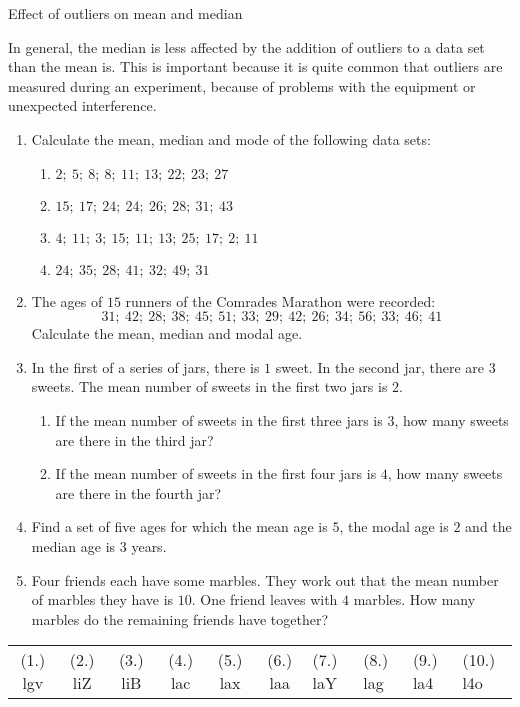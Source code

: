 \begin{wex}{Effect of outliers on mean and median}
{  In general, the median is less affected by the addition of outliers
  to a data set than the mean is. This is important because it is
  quite common that outliers are measured during an experiment,
  because of problems with the equipment or unexpected interference.

}
\end{wex}

\begin{exercises}{}{
\begin{enumerate}[noitemsep, label=\textbf{\arabic*}.]
\item Calculate the mean, median and mode of the following data sets:
\begin{enumerate}[noitemsep, label=\textbf{(\alph*)} ]
 \item $2;~5;~8;~8;~11;~13;~22;~23;~27$
\item $15;~17;~24;~24;~26;~28;~31;~43$
\item $4;~11;~3;~15;~11;~13;~25;~17;~2;~11$
\item $24;~35;~28;~41;~32;~49;~31$
\end{enumerate}
\item The ages of $15$ runners of the Comrades Marathon were recorded:
\begin{equation*}
31;~42;~28;~38;~45;~51;~33;~29;~42;~26;~34;~56;~33;~46;~41
\end{equation*}
Calculate the mean, median and modal age.
\item In the first of a series of jars, there is $1$ sweet. In the
  second jar, there are $3$ sweets. The mean number of sweets in the
  first two jars is $2$.
\begin{enumerate}[noitemsep, label=\textbf{(\alph*)} ]
  \item If the mean number of sweets in the first three jars is $3$, how
    many sweets are there in the third jar?
  \item If the mean number of sweets in the first four jars is $4$, how
    many sweets are there in the fourth jar?
  \end{enumerate}

\item Find a set of five ages for which the mean age is $5$, the modal
  age is $2$ and the median age is $3$ years.

\item Four friends each have some marbles. They work out that the mean
  number of marbles they have is $10$. One friend leaves with $4$
  marbles. How many marbles do the remaining friends have together?

\end{enumerate}
\practiceinfo
\par 
\par \begin{tabular}[h]{cccccc}
(1.) lgv  &  (2.) liZ  &  (3.) liB  &  (4.) lac  &  (5.) lax  &  (6.) laa  &  (7.) laY  &  (8.) lag  &  (9.) la4  &  (10.) l4o  & \end{tabular}
}
\end{exercises}

